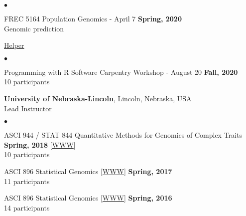 \documentclass[margin,line,10pt]{res}
\newenvironment{list2}{
  \begin{list}{$\bullet$}{%
      \setlength{\itemsep}{0in}
      \setlength{\parsep}{0in} \setlength{\parskip}{0in}
      \setlength{\topsep}{0in} \setlength{\partopsep}{0in} 
      \setlength{\leftmargin}{0.2in}}}{\end{list}}
\begin{document}
\begin{resume}
  \vspace{0.3cm}

 
\vspace{0.4cm}
 \begin{list2}
 \item FREC 5164 Population Genomics - April 7  \hfill {\bf Spring, 2020} \\
   Genomic prediction
\end{list2}


 \vspace{0.3cm}


\underline{Helper}
 \vspace{0.4cm}
 \begin{list2}
 \item Programming with R Software Carpentry Workshop - August 20  \hfill {\bf Fall, 2020} \\
   10  participants 
\end{list2}

 
      \vspace{1cm}


{\bf University of Nebraska-Lincoln}, Lincoln, Nebraska, USA  \vspace{0.2cm} \\
\underline{Lead Instructor}
\vspace{0.4cm}
\begin{list2}

\item ASCI 944 / STAT 844 Quantitative Methods for Genomics of Complex Traits
  \hfill {\bf Spring, 2018} 
         [\textcolor{blue}{\href{http://morotalab.org/asci944-2018/ASCI944.html}{WWW}}] \\
         10  participants %

   \vspace{0.5cm}

\item ASCI 896 Statistical Genomics [\textcolor{blue}{\href{http://morotalab.org/asci896-2017/ASCI896.html}{WWW}}]
  \hfill {\bf Spring, 2017} \\
  11  participants   %

  \vspace{0.5cm}

\item ASCI 896 Statistical Genomics [\textcolor{blue}{\href{http://morotalab.org/asci896-2016/ASCI896.html}{WWW}}]
  \hfill {\bf Spring, 2016} \\
14 participants %

\end{list2}
\vspace{.01pt}
        


\end{resume}
\end{document}
